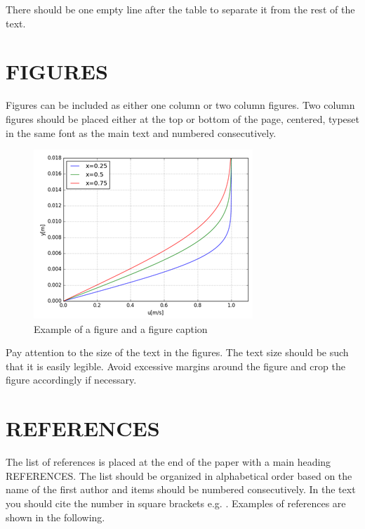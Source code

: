 \documentclass{cfm_paper} %
\begin{document}
There should be one empty line after the table to separate it from the rest of the text.
\section*{FIGURES}
Figures can be included as either one column or two column figures. Two column figures should be placed either at the top or bottom of the page, centered, typeset in the same font as the main text and numbered consecutively.

\begin{figure}
    \includegraphics[width = \columnwidth]{cfm_test.png}
    \caption{Example of a figure and a figure caption} %
    \label{fig:ExampleFigure}
\end{figure}

Pay attention to the size of the text in the figures. The text size should be such that it is easily legible. Avoid excessive margins around the figure and crop the figure accordingly if necessary.

\section*{REFERENCES}
The list of references is placed at the end of the paper with a main heading REFERENCES. The list should be organized in alphabetical order based on the name of the first author and items should be numbered consecutively. In the text you should cite the number in square brackets e.g. \cite{Hanninen2016, Tu2012}. %
Examples of references are shown in the following.

\printbibliography[title={REFERENCES}] %
\end{document}
